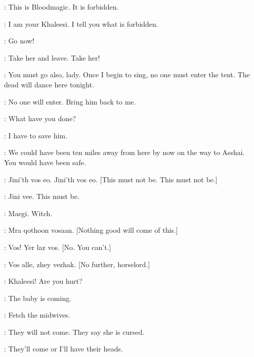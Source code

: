 \RAKHARO: This is Bloodmagic. It is forbidden. 

\DAENERYS: I am your Khaleesi. I tell you what is forbidden. 

\MIRRI: Go now! 

\DAENERYS:  Take her and leave. Take her! 


\MIRRI: You must go also, lady. Once I begin to sing, no one must enter the tent. The dead will dance here tonight. 

\DAENERYS: No one will enter.  Bring him back to me. 


\JORAH: What have you done? 

\DAENERYS: I have to save him. 

\JORAH: We could have been ten miles away from here by now on the way to Asshai. You would have been safe. 

\QOTHO:  Jini'th vos eo. Jini'th vos eo. [This must not be. This must not be.]

\DAENERYS: Jini vee. This must be. 

\QOTHO: Maegi. Witch. 

\RAKHARO:  Mra qothoon vosaan. [Nothing good will come of this.] 


\DAENERYS:  Vos! Yer laz vos. [No. You can't.]

\JORAH: Vos alle, zhey vezhak. [No further, horselord.] 


\JORAH: Khaleesi! Are you hurt? 

\DAENERYS: The baby is coming. 

\JORAH: Fetch the midwives. 

\RAKHARO: They will not come. They say she is cursed. 

\JORAH: They'll come or I'll have their heads. 

